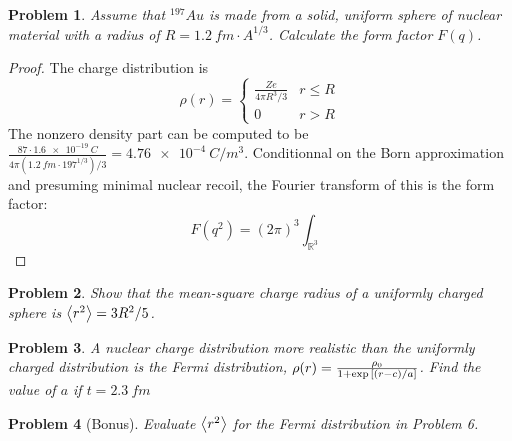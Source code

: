 \documentclass{article}
\newtheorem{plm}{Problem}
\begin{document}
\begin{plm}
  Assume that $^{197}Au$ is made from a solid, uniform sphere of nuclear material with a radius of $R = \SI{1.2}{fm} \cdot A^{1/3}$.
  Calculate the form factor $F(q)$.
\end{plm}

\begin{proof}
  The charge distribution is
  \[
    \rho(r) =
    \begin{cases}
      \frac{Ze}{4\pi R^{3}/3} & r \leq R \\
      0 & r > R
    \end{cases}
  \]
  The nonzero density part can be computed to be $\frac{87 \cdot \SI{1.6e-19}{C}}{4\pi (\SI{1.2}{fm} \cdot 197^{1/3})/3} = \SI{4.76e-4}{C/m^{3}}$.
  Conditionnal on the Born approximation and presuming minimal nuclear recoil, the Fourier transform of this is the form factor:
  \[
    F(q^{2}) = (2\pi)^{3} \int_{\mathbb{R}^{3}}
  \]

\end{proof}

\begin{plm}
  Show that the mean-square charge radius of a uniformly charged sphere is $\expval{r^{2}} = 3R^{2}/5$.
\end{plm}

\begin{plm}
  A nuclear charge distribution more realistic than the uniformly charged distribution is the Fermi distribution,
  $\rho(r) = \frac{\rho_{0}}{1 + \exp\qty[(r - c)/a]}$.
  Find the value of $a$ if $t = \SI{2.3}{fm}$
\end{plm}

\begin{plm}[Bonus]
  Evaluate $\expval{r^{2}}$ for the Fermi distribution in Problem 6.
\end{plm}
\end{document}
